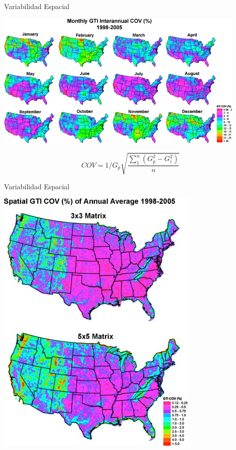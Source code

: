 \documentclass[xcolor={usenames,svgnames,dvipsnames}]{beamer}
\begin{document}
\begin{frame}[label={sec:org522bc5d}]{Variabilidad Espacial}
\begin{center}
\includegraphics[width=0.9\textwidth]{../figs/SpatialVariability.jpg}
\end{center}

\[
COV = 1/G_p \sqrt{\frac{\sum_1^{n}(G_p^2 - G_i^2)}{n}}
\]

\nocite{Gueymard.Wilcox2011a}
\end{frame}

\begin{frame}[label={sec:org6f5ed55}]{Variabilidad Espacial}
\begin{center}
\begin{center}
\includegraphics[height=0.9\textheight]{../figs/SpatialVariability_Annual.jpg}
\end{center}
\end{center}
\end{frame}
\end{document}
